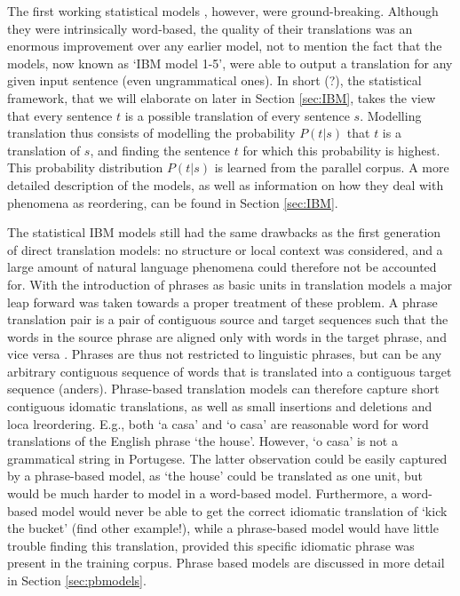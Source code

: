 \documentclass{report}
\theoremstyle{definition}
\theoremstyle{plain}
\begin{document}
The first working statistical models \citep{brown1988statistical,brown1990statistical,brown1993mathematics}, however, were ground-breaking. Although they were intrinsically word-based, the quality of their translations was an enormous improvement over any earlier model, not to mention the fact that the models, now known as `IBM model 1-5', were able to output a translation for any given input sentence (even ungrammatical ones). In short (?), the statistical framework, that we will elaborate on later in Section \ref{sec:IBM}, takes the view that every sentence $t$ is a possible translation of every sentence $s$. Modelling translation thus consists of modelling the probability $P(t|s)$ that $t$ is a translation of $s$, and finding the sentence $t$ for which this probability is highest. This probability distribution $P(t|s)$ is learned from the parallel corpus. A more detailed description of the models, as well as information on how they deal with phenomena as reordering, can be found in Section \ref{sec:IBM}.

The statistical IBM models still had the same drawbacks as the first generation of direct translation models: no structure or local context was considered, and a large amount of natural language phenomena could therefore not be accounted for. With the introduction of phrases as basic units in translation models \citep{wang1998grammar,och1999improved} a major leap forward was taken towards a proper treatment of these problem. A phrase translation pair is a pair of contiguous source and target sequences such that the words in the source phrase are aligned only with words in the target phrase, and vice versa \citep{och2000improved}. Phrases are thus not restricted to linguistic phrases, but can be any arbitrary contiguous sequence of words that is translated into a contiguous target sequence (anders).
Phrase-based translation models can therefore capture short contiguous idomatic translations, as well as small insertions and deletions and loca lreordering. E.g., both `a casa' and `o casa' are reasonable word for word translations of the English phrase `the house'. However, `o casa' is not a grammatical string in Portugese. The latter observation could be easily captured by a phrase-based model, as `the house' could be translated as one unit, but would be much harder to model in a word-based model. Furthermore, a word-based model would never be able to get the correct idiomatic translation of `kick the bucket' (find other example!), while a phrase-based model would have little trouble finding this translation, provided this specific idiomatic phrase was present in the training corpus. Phrase based models are discussed in more detail in Section \ref{sec:pbmodels}.
\end{document}
